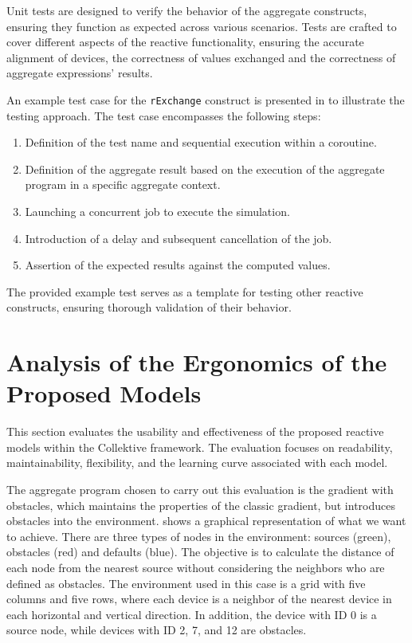 Unit tests are designed to verify the behavior of the aggregate constructs, ensuring they function as expected across various scenarios. Tests are crafted to cover different aspects of the reactive functionality, ensuring the accurate alignment of devices, the correctness of values exchanged and the correctness of aggregate expressions' results.

An example test case for the \texttt{rExchange} construct is presented in  to illustrate the testing approach. The test case encompasses the following steps:

\begin{enumerate}
    \item Definition of the test name and sequential execution within a coroutine.
    \item Definition of the aggregate result based on the execution of the aggregate program in a specific aggregate context.
    \item Launching a concurrent job to execute the simulation.
    \item Introduction of a delay and subsequent cancellation of the job.
    \item Assertion of the expected results against the computed values.
\end{enumerate}

The provided example test serves as a template for testing other reactive constructs, ensuring thorough validation of their behavior.



\section{Analysis of the Ergonomics of the Proposed Models}
\label{section:analysis-ergonomics-proposed-models}

This section evaluates the usability and effectiveness of the proposed reactive models within the Collektive framework. The evaluation focuses on readability, maintainability, flexibility, and the learning curve associated with each model.

The aggregate program chosen to carry out this evaluation is the gradient with obstacles, which maintains the properties of the classic gradient, but introduces obstacles into the environment.  shows a graphical representation of what we want to achieve. There are three types of nodes in the environment: sources (green), obstacles (red) and defaults (blue). The objective is to calculate the distance of each node from the nearest source without considering the neighbors who are defined as obstacles. The environment used in this case is a grid with five columns and five rows, where each device is a neighbor of the nearest device in each horizontal and vertical direction. In addition, the device with ID 0 is a source node, while devices with ID 2, 7, and 12 are obstacles.

